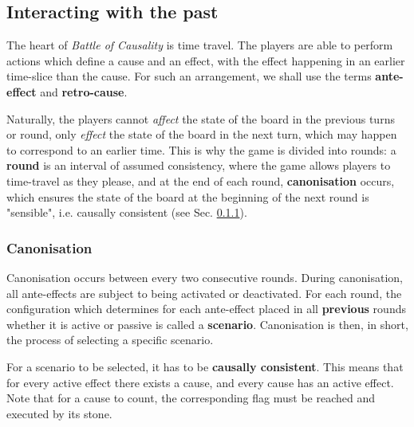 \documentclass[12pt]{article}
\begin{document}
	\subsection{Interacting with the past}
	The heart of \textit{Battle of Causality} is time travel. The players are able to perform actions which define a cause and an effect, with the effect happening in an earlier time-slice than the cause. For such an arrangement, we shall use the terms \textbf{ante-effect} and \textbf{retro-cause}.
	
	Naturally, the players cannot \textit{affect} the state of the board in the previous turns or round, only \textit{effect} the state of the board in the next turn, which may happen to correspond to an earlier time. This is why the game is divided into rounds: a \textbf{round} is an interval of assumed consistency, where the game allows players to time-travel as they please, and at the end of each round, \textbf{canonisation} occurs, which ensures the state of the board at the beginning of the next round is "sensible", i.e. causally consistent (see Sec. \ref{sec:canonisation}).
	
	\subsubsection{Canonisation}\label{sec:canonisation}
	Canonisation occurs between every two consecutive rounds. During canonisation, all ante-effects are subject to being activated or deactivated. For each round, the configuration which determines for each ante-effect placed in all \textbf{previous} rounds whether it is active or passive is called a \textbf{scenario}. Canonisation is then, in short, the process of selecting a specific scenario.
	
	For a scenario to be selected, it has to be \textbf{causally consistent}. This means that for every active effect there exists a cause, and every cause has an active effect. Note that for a cause to count, the corresponding flag must be reached and executed by its stone.
	
\end{document}
